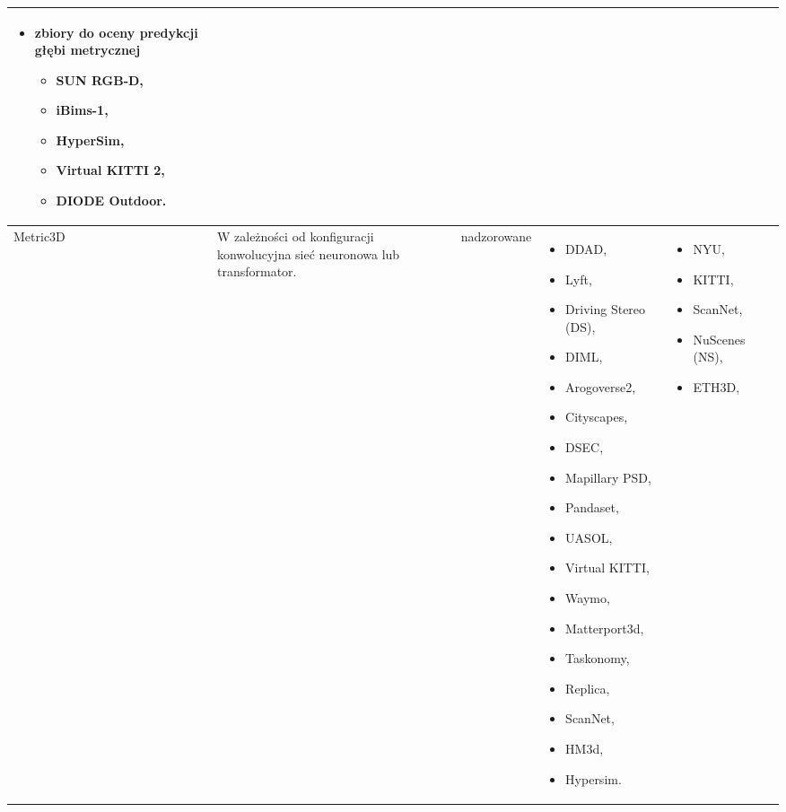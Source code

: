 \begin{table}[H]
{\begin{tabular}{ |l|p{2cm}|p{3cm}|p{5cm}|p{5cm}|r| }
\begin{itemize}
            \item zbiory do oceny predykcji głębi metrycznej
            \begin{itemize} 
                \item SUN RGB-D,
                \item iBims-1,
                \item HyperSim,
                \item Virtual KITTI 2,
                \item DIODE Outdoor.
            \end{itemize}
        \end{itemize}\\
        \hline
        Metric3D &
        W zależności od konfiguracji konwolucyjna sieć neuronowa lub transformator. &
        nadzorowane &
        \begin{itemize}
            \item DDAD,
            \item Lyft,
            \item Driving Stereo (DS),
            \item DIML,
            \item Arogoverse2,
            \item Cityscapes,
            \item DSEC,
            \item Mapillary PSD,
            \item Pandaset,
            \item UASOL,
            \item Virtual KITTI,
            \item Waymo,
            \item Matterport3d,
            \item Taskonomy,
            \item Replica,
            \item ScanNet,
            \item HM3d,
            \item Hypersim.
        \end{itemize} & 
        \begin{itemize}
            \item NYU,
            \item KITTI,
            \item ScanNet,
            \item NuScenes (NS),
            \item ETH3D,

\end{itemize}
\end{tabular}}
\end{table}
